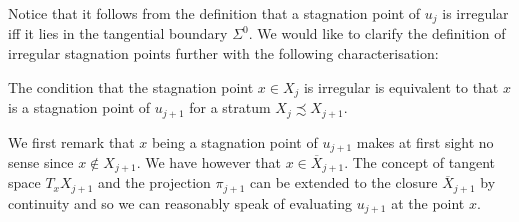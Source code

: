 Notice that it follows from the definition that a stagnation point of $u_j$ is irregular iff it
lies in the tangential boundary $\Sigma^0$.
We would like to clarify the definition of irregular stagnation points further with the following characterisation:
\begin{proposition}\label{pr:characterisation_irregular_bd}
  The condition that the stagnation point $x\in X_j$ is irregular is equivalent to that
  $x$ is a stagnation point of $u_{j+1}$ for a stratum $X_j\precsim X_{j+1}$.
\end{proposition}
We first remark that $x$ being a stagnation point of $u_{j+1}$ makes at first sight no sense since $x\notin X_{j+1}$.
We have however that $x\in\overline{X}_{j+1}$. The concept of tangent space $T_xX_{j+1}$ and the projection $\pi_{j+1}$
can be extended to the closure $\overline{X}_{j+1}$ by continuity and so we can reasonably speak of evaluating $u_{j+1}$ at the point $x$.
